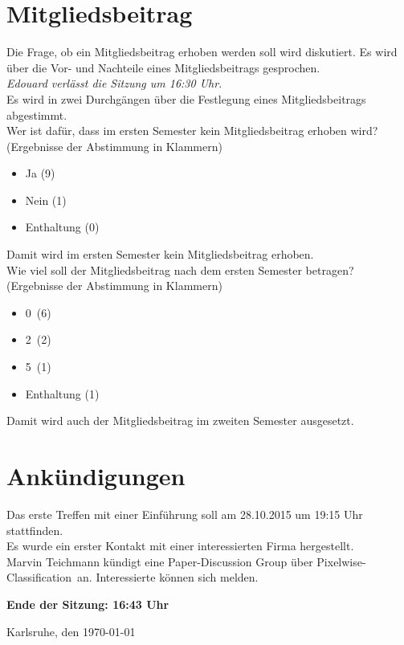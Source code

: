\documentclass[a4paper,12pt,oneside]{scrartcl} %
\begin{document}
\section{Mitgliedsbeitrag}
Die Frage, ob ein Mitgliedsbeitrag erhoben werden soll wird diskutiert. Es wird über die Vor- und Nachteile eines Mitgliedsbeitrags gesprochen.\\
\emph{Edouard verlässt die Sitzung um 16:30 Uhr.}\\

Es wird in zwei Durchgängen über die Festlegung eines Mitgliedsbeitrags abgestimmt.\\
 
Wer ist dafür, dass im ersten Semester kein Mitgliedsbeitrag erhoben wird? (Ergebnisse der Abstimmung in Klammern)
\begin{itemize}
\item Ja (9)
\item Nein (1)
\item Enthaltung (0)
\end{itemize}
Damit wird im ersten Semester kein Mitgliedsbeitrag erhoben.\\

Wie viel soll der Mitgliedsbeitrag nach dem ersten Semester betragen? (Ergebnisse der Abstimmung in Klammern)
\begin{itemize}
\item 0\officialeuro\ (6)
\item 2\officialeuro\ (2)
\item 5\officialeuro\ (1)
\item Enthaltung (1)
\end{itemize}
Damit wird auch der Mitgliedsbeitrag im zweiten Semester ausgesetzt.

\section{Ankündigungen}
Das erste Treffen mit einer Einführung soll am 28.10.2015 um 19:15 Uhr stattfinden.\\
Es wurde ein erster Kontakt mit einer interessierten Firma hergestellt.\\
Marvin Teichmann kündigt eine Paper-Discussion Group über \glqq Pixelwise-Classification\grqq\ an. Interessierte können sich melden.

\bigskip\textbf{Ende der Sitzung: 16:43 Uhr}
\begin{flushright}
Karlsruhe, den \today
\end{flushright}
\end{document}
